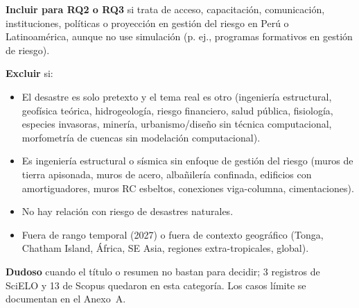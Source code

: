 \documentclass[12pt,a4paper]{article}
\begin{document}
\textbf{Incluir para RQ2 o RQ3} si trata de acceso, capacitación, comunicación, instituciones, políticas o proyección en gestión del riesgo en Perú o Latinoamérica, aunque no use simulación (p. ej., programas formativos en gestión de riesgo).

\textbf{Excluir} si:
\begin{itemize}
  \item El desastre es solo pretexto y el tema real es otro (ingeniería estructural, geofísica teórica, hidrogeología, riesgo financiero, salud pública, fisiología, especies invasoras, minería, urbanismo/diseño sin técnica computacional, morfometría de cuencas sin modelación computacional).
  \item Es ingeniería estructural o sísmica sin enfoque de gestión del riesgo (muros de tierra apisonada, muros de acero, albañilería confinada, edificios con amortiguadores, muros RC esbeltos, conexiones viga-columna, cimentaciones).
  \item No hay relación con riesgo de desastres naturales.
  \item Fuera de rango temporal (2027) o fuera de contexto geográfico (Tonga, Chatham Island, África, SE Asia, regiones extra-tropicales, global).
\end{itemize}

\textbf{Dudoso} cuando el título o resumen no bastan para decidir; 3 registros de SciELO y 13 de Scopus quedaron en esta categoría. Los casos límite se documentan en el Anexo~A.
\end{document}
